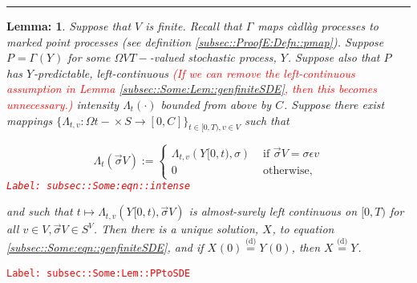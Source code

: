 \documentclass[12pt]{article}
\newcommand{\ra}{\rightarrow}
\newcommand{\te}{\text}
\newcommand{\ep}{\epsilon}
\newcommand{\tr}{\textcolor{red}}
\newcommand{\labe}[1]{\tr{\texttt{Label: #1}}}
\newcommand{\lin}{\rule{\linewidth}{0.4 pt}}
\newcommand{\deq}{\overset{\text{(d)}}{=}}			%
\renewcommand{\v}{v}							%
\renewcommand{\S}{S}							%
\newcommand{\s}{\sigma}							%
\newcommand{\sv}{\vec{\s}}						%
\newcommand{\ev}{\ep}							%
\newcommand{\T}{T}								%
\renewcommand{\t}{t}							%
\newcommand{\V}{V}									%
\newcommand{\XState}[1]{\S^{#1}}				%
\newcommand{\rxvt}[2]{X_{#1}{(#2)}}					%
\newcommand{\rxvtt}[2]{Y_{#1}{(#2)}}				%
\newcommand{\rxvts}[2]{X_{#1}{#2}}					%
\newcommand{\rxvtts}[2]{Y_{#1}{#2}}					%
\newcommand{\rp}[1]{P^{#1}}							%
\newcommand{\ratee}[1]{\Lambda_{#1}}				%
\newcommand{\const}[1]{C_{#1}}						%
\newcommand{\pmap}[1]{\Gamma_{#1}}				%
\newtheorem{lem}[thms]{Lemma: }
\begin{document}
\lin

\begin{lem}
Suppose that \(\V\) is finite. Recall that \(\pmap{}\) maps c\`adl\`ag processes to marked point processes (see definition \ref{subsec::ProofE:Defn::pmap}). Suppose \(\rp{} = \pmap{}(\rxvtts{}{})\) for some \(\Omega{\V}{\T-}\)-valued stochastic process, \(\rxvtts{}{}\). Suppose also that \(\rp{}\) has \(\rxvtts{}{}\)-predictable, left-continuous \tr{(If we can remove the left-continuous assumption in Lemma \ref{subsec::Some:Lem::genfiniteSDE}, then this becomes unnecessary.)} intensity \(\ratee{\t}(\cdot)\) bounded from above by \(\const{}\). Suppose there exist mappings \(\{\ratee{\t,\v}:\Omega{}{\t-}\times \S \ra [0,\const{}]\}_{\t\in[0,\T),\v\in \V}\) such that 

\begin{equation}
\ratee{\t}(\sv{}{\V}) := \begin{cases}
\ratee{\t,\v}(\rxvtts{}{[0,\t)},\s) &\te{ if } \sv{}{\V} = \s\ev{\v}\\
0 &\te{ otherwise,}
\end{cases}
\label{subsec::Some:eqn::intense}
\end{equation}
\labe{subsec::Some:eqn::intense}

and such that \(\t\mapsto \ratee{\t,\v}(\rxvtts{}{[0,\t)},\sv{}{\V})\) is almost-surely left continuous on \([0,\T)\) for all \(\v\in \V,\sv{}{\V}\in \S^\V\). Then there is a unique solution, \(\rxvts{}{}\), to equation \eqref{subsec::Some:eqn::genfiniteSDE}, and if \(\rxvt{}{0} \deq \rxvtt{}{0}\), then \(\rxvts{}{} \deq \rxvtts{}{}\).

\label{subsec::Some:Lem::PPtoSDE}
\end{lem}
\labe{subsec::Some:Lem::PPtoSDE}
\end{document}
